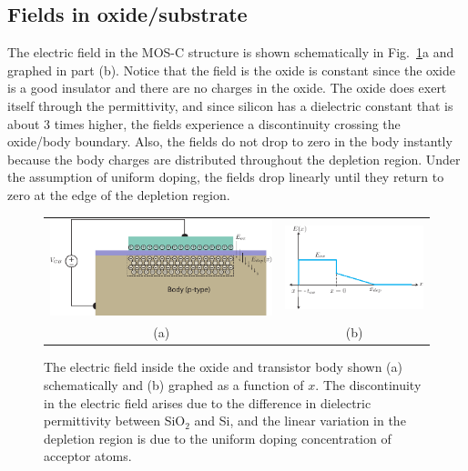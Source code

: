\subsection{Fields in oxide/substrate}
The electric field in the MOS-C structure is shown schematically in Fig.~\ref{fig:mos_field_oxide_semi}a and graphed in part (b).  Notice that the field is the oxide is constant since the oxide is a good insulator and there are no charges in the oxide.  The oxide does exert itself through the permittivity, and since silicon has a dielectric constant that is about 3 times higher, the fields experience a discontinuity crossing the oxide/body boundary.  Also, the fields do not drop to zero in the body instantly because the body charges are distributed throughout the depletion region.  Under the assumption of uniform doping, the fields drop linearly until they return to zero at the edge of the depletion region.   
\begin{figure}[tbh]
\centering
\begin{tabular}{cc}
\includegraphics[width=.55\columnwidth]{mos_cap_Efields} &
\includegraphics[width=.35\columnwidth]{MOS_E_field}\\
(a) & (b)\\
\end{tabular}
\caption{The electric field inside the oxide and transistor body shown (a) schematically and (b) graphed as a function of $x$.  The discontinuity in the electric field arises due to the difference in dielectric permittivity between SiO$_2$ and Si, and the linear variation in the depletion region is due to the uniform doping concentration of acceptor atoms.}
\label{fig:mos_field_oxide_semi}
\end{figure}
